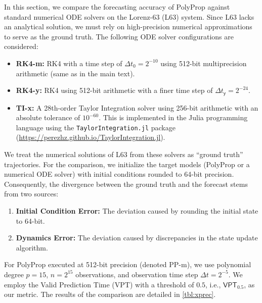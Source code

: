 \documentclass{article}
\newcommand{\stepsize}{\Delta\!t}
\newcommand{\vpt}[1]{\mathsf{VPT}_{#1}}
\begin{document}
In this section, we compare the forecasting accuracy of PolyProp against standard numerical ODE solvers on the Lorenz-63 (L63) system. Since L63 lacks an analytical solution, we must rely on high-precision numerical approximations to serve as the ground truth. The following ODE solver configurations are considered:
\begin{itemize}
	\item \textbf{RK4-m:} RK4 with a time step of $\stepsize_0 = 2^{-10}$ using 512-bit multiprecision arithmetic (same as in the main text).
	\item \textbf{RK4-y:} RK4 using 512-bit arithmetic with a finer time step of $\stepsize_{\mathsf{y}} = 2^{-24}$.
	\item \textbf{TI-x:} A 28th-order Taylor Integration solver using 256-bit arithmetic with an absolute tolerance of $10^{-60}$. This is implemented in the Julia programming language using the \texttt{TaylorIntegration.jl} package (\url{https://perezhz.github.io/TaylorIntegration.jl}).
\end{itemize}

We treat the numerical solutions of L63 from these solvers as ``ground truth'' trajectories. For the comparison, we initialize the target models (PolyProp or a numerical ODE solver) with initial conditions rounded to 64-bit precision. Consequently, the divergence between the ground truth and the forecast stems from two sources:
\begin{enumerate}
	\item \textbf{Initial Condition Error:} The deviation caused by rounding the initial state to 64-bit.
	\item \textbf{Dynamics Error:} The deviation caused by discrepancies in the state update algorithm.
\end{enumerate}

For PolyProp executed at 512-bit precision (denoted PP-m), we use polynomial degree $p=15$, $n=2^{15}$ observations, and observation time step $\stepsize = 2^{-5}$. We employ the Valid Prediction Time (VPT) with a threshold of $0.5$, i.e., $\vpt{0.5}$, as our metric.
The results of the comparison are detailed in \cref{tbl:xprec}.
\end{document}
